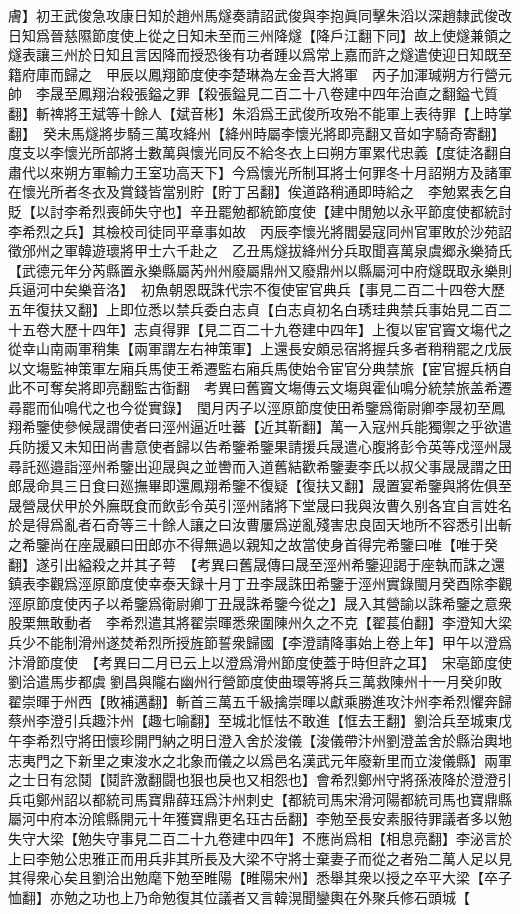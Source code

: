 膚】初王武俊急攻康日知於趙州馬燧奏請詔武俊與李抱眞同擊朱滔以深趙隸武俊改日知爲晉慈隰節度使上從之日知未至而三州降燧【降戶江翻下同】故上使燧兼領之燧表讓三州於日知且言因降而授恐後有功者踵以爲常上嘉而許之燧遣使迎日知既至籍府庫而歸之　甲辰以鳳翔節度使李楚琳為左金吾大將軍　丙子加渾瑊朔方行營元帥　李晟至鳳翔治殺張鎰之罪【殺張鎰見二百二十八卷建中四年治直之翻鎰弋質翻】斬禆將王斌等十餘人【斌音彬】朱滔爲王武俊所攻殆不能軍上表待罪【上時掌翻】　癸未馬燧將步騎三萬攻絳州【絳州時屬李懷光將即亮翻又音如字騎奇寄翻】　度支以李懷光所部將士數萬與懷光同反不給冬衣上曰朔方軍累代忠義【度徒洛翻自肅代以來朔方軍輸力王室功高天下】今爲懷光所制耳將士何罪冬十月詔朔方及諸軍在懷光所者冬衣及賞錢皆當别貯【貯丁呂翻】俟道路稍通即時給之　李勉累表乞自貶【以討李希烈喪師失守也】辛丑罷勉都統節度使【建中閒勉以永平節度使都統討李希烈之兵】其檢校司徒同平章事如故　丙辰李懷光將閻晏寇同州官軍敗於沙苑詔徵邠州之軍韓遊瓌將甲士六千赴之　乙丑馬燧拔絳州分兵取聞喜萬泉虞郷永樂猗氏【武德元年分芮縣置永樂縣屬芮州州廢屬鼎州又廢鼎州以縣屬河中府燧既取永樂則兵逼河中矣樂音洛】　初魚朝恩既誅代宗不復使宦官典兵【事見二百二十四卷大歷五年復扶又翻】上即位悉以禁兵委白志貞【白志貞初名白琇珪典禁兵事始見二百二十五卷大歷十四年】志貞得罪【見二百二十九卷建中四年】上復以宦官竇文塲代之從幸山南兩軍稍集【兩軍謂左右神策軍】上還長安頗忌宿將握兵多者稍稍罷之戊辰以文塲監神策軍左廂兵馬使王希遷監右廂兵馬使始令宦官分典禁旅【宦官握兵柄自此不可奪矣將即亮翻監古衘翻　考異曰舊竇文塲傳云文塲與霍仙鳴分統禁旅盖希遷尋罷而仙鳴代之也今從實錄】　閠月丙子以涇原節度使田希鑒爲衛尉卿李晟初至鳳翔希鑒使參候晟謂使者曰涇州逼近吐蕃【近其靳翻】萬一入寇州兵能獨禦之乎欲遣兵防援又未知田尚書意使者歸以告希鑒希鑒果請援兵晟遣心腹將彭令英等戍涇州晟尋託廵邉詣涇州希鑒出迎晟與之並轡而入道舊結歡希鑒妻李氏以叔父事晟晟謂之田郎晟命具三日食曰廵撫畢即還鳳翔希鑒不復疑【復扶又翻】晟置宴希鑒與將佐俱至晟營晟伏甲於外廡既食而飲彭令英引涇州諸將下堂晟曰我與汝曹久别各宜自言姓名於是得爲亂者石奇等三十餘人讓之曰汝曹屢爲逆亂殘害忠良固天地所不容悉引出斬之希鑒尚在座晟顧曰田郎亦不得無過以親知之故當使身首得完希鑒曰唯【唯于癸翻】遂引出縊殺之并其子萼　【考異曰舊晟傳曰晟至涇州希鑒迎謁于座執而誅之還鎮表李觀爲涇原節度使幸泰天録十月丁丑李晟誅田希鑒于涇州實錄閩月癸酉除李觀涇原節度使丙子以希鑒爲衛尉卿丁丑晟誅希鑒今從之】晟入其營諭以誅希鑒之意衆股栗無敢動者　李希烈遣其將翟崇暉悉衆圍陳州久之不克【翟萇伯翻】李澄知大梁兵少不能制滑州遂焚希烈所授旌節誓衆歸國【李澄請降事始上卷上年】甲午以澄爲汴滑節度使　【考異曰二月已云上以澄爲滑州節度使蓋于時但許之耳】　宋亳節度使劉洽遣馬步都虞劉昌與隴右幽州行營節度使曲環等將兵三萬救陳州十一月癸卯敗翟崇暉于州西【敗補邁翻】斬首三萬五千級擒崇暉以獻乘勝進攻汴州李希烈懼奔歸蔡州李澄引兵趣汴州【趣七喻翻】至城北恇怯不敢進【恇去王翻】劉洽兵至城東戊午李希烈守將田懷珍開門納之明日澄入舍於浚儀【浚儀帶汴州劉澄盖舍於縣治輿地志夷門之下新里之東浚水之北象而儀之以爲邑名漢武元年廢新里而立浚儀縣】兩軍之士日有忿鬩【鬩許激翻闘也狠也戾也又相怨也】會希烈鄭州守將孫液降於澄澄引兵屯鄭州詔以都統司馬寶鼎薛珏爲汴州刺史【都統司馬宋滑河陽都統司馬也寶鼎縣屬河中府本汾隂縣開元十年獲寶鼎更名珏古岳翻】李勉至長安素服待罪議者多以勉失守大梁【勉失守事見二百二十九卷建中四年】不應尚爲相【相息亮翻】李泌言於上曰李勉公忠雅正而用兵非其所長及大梁不守將士棄妻子而從之者殆二萬人足以見其得衆心矣且劉洽出勉麾下勉至睢陽【睢陽宋州】悉舉其衆以授之卒平大梁【卒子恤翻】亦勉之功也上乃命勉復其位議者又言韓滉聞鑾輿在外聚兵修石頭城【
